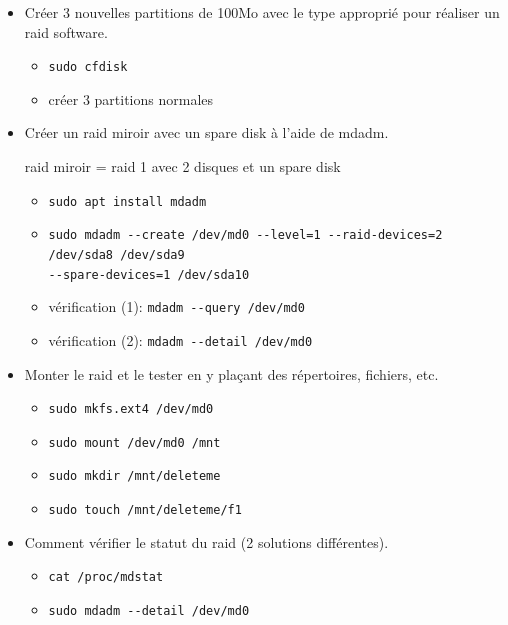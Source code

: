 \documentclass[a4paper]{article}
\begin{document}
\begin{itemize}

\item Créer 3 nouvelles partitions de 100Mo avec le type approprié pour réaliser un raid software.
\begin{example}
    \begin{itemize}
        \item \texttt{sudo cfdisk}
        \item créer 3 partitions normales
    \end{itemize}
\end{example}

\item Créer un raid miroir avec un spare disk à l'aide de mdadm.
\begin{example}
    raid miroir = raid 1 avec 2 disques et un spare disk
    \begin{itemize}
        \item \texttt{sudo apt install mdadm}
        \item \texttt{sudo mdadm -{}-create /dev/md0 -{}-level=1 -{}-raid-devices=2 /dev/sda8 /dev/sda9} \\
        \texttt{-{}-spare-devices=1 /dev/sda10}
        \item vérification (1): \texttt{mdadm -{}-query /dev/md0}
        \item vérification (2): \texttt{mdadm -{}-detail /dev/md0}
    \end{itemize}
\end{example}

\item Monter le raid et le tester en y plaçant des répertoires, fichiers, etc.
\begin{example}
    \begin{itemize}
        \item \texttt{sudo mkfs.ext4 /dev/md0}
        \item \texttt{sudo mount /dev/md0 /mnt}
        \item \texttt{sudo mkdir /mnt/deleteme}
        \item \texttt{sudo touch /mnt/deleteme/f1}
    \end{itemize}
\end{example}

\item Comment vérifier le statut du raid (2 solutions différentes).
\begin{example}
    \begin{itemize}
        \item \texttt{cat /proc/mdstat}
        \item \texttt{sudo mdadm -{}-detail /dev/md0}
    \end{itemize}
\end{example}


\end{itemize}
\end{document}

